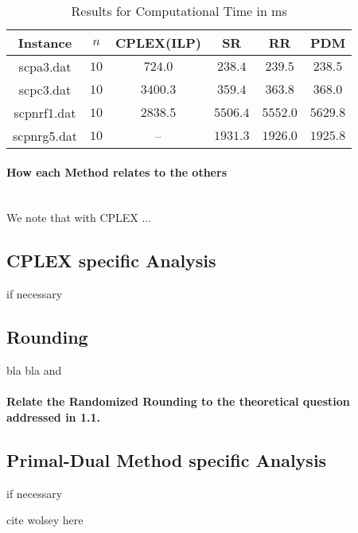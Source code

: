 \documentclass[11pt,a4paper,english]{article}
\begin{document}
\begin{table}[h!]
  \centering
  \begin{tabular}{|c|c|c|c|c|c|}\hline
    Instance& $n$& CPLEX(ILP)&SR&RR&PDM \\\hline
    scpa3.dat &$10$&$724.0$ & $238.4$& $239.5$ & $238.5$  \\
    scpc3.dat &$10$ & $3400.3$ & $359.4$& $363.8$ & $368.0$ \\
    scpnrf1.dat	 &$10$ & $2838.5$ & $5506.4$& $5552.0$ & $5629.8$  \\
    scpnrg5.dat &$10$ & -- & $1931.3$& $1926.0$ & $1925.8$  \\\hline
  \end{tabular}
  \caption{Results for Computational Time in ms}
  \label{tab:res}
\end{table}

\paragraph{How each Method relates to the others}\mbox{}\\
We note that with CPLEX ...



\subsection{CPLEX specific Analysis}
if necessary
\subsection{Rounding}
bla bla and
\paragraph{Relate the Randomized Rounding to the theoretical question addressed in 1.1.}

\subsection{Primal-Dual Method specific Analysis}
if necessary



cite wolsey here


\clearpage


\end{document}

